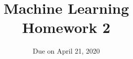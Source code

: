 \documentclass[12pt]{article}
\title{Machine Learning\\ Homework 2}
\author{Due on April 21, 2020}
\date{}
\begin{document}
\maketitle


\begin{enumerate}

%


\end{enumerate}
\end{document}
